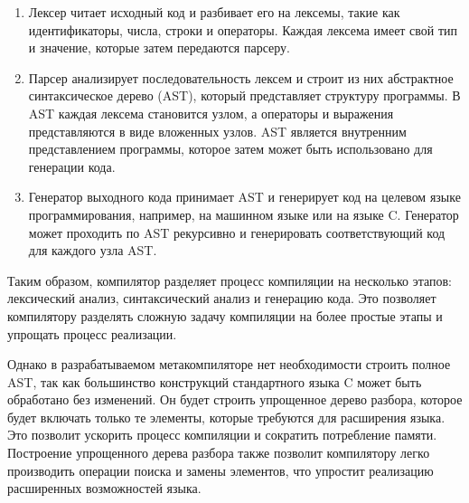 \begin{enumerate}
  \item Лексер читает исходный код и разбивает его на лексемы, такие как идентификаторы, числа, строки и операторы. Каждая лексема имеет свой тип и значение, которые затем передаются парсеру.

  \item Парсер анализирует последовательность лексем и строит из них абстрактное синтаксическое дерево (AST), который представляет структуру программы. В AST каждая лексема становится узлом, а операторы и выражения представляются в виде вложенных узлов. AST является внутренним представлением программы, которое затем может быть использовано для генерации кода.

  \item Генератор выходного кода принимает AST и генерирует код на целевом языке программирования, например, на машинном языке или на языке C. Генератор может проходить по AST рекурсивно и генерировать соответствующий код для каждого узла AST.
\end{enumerate}

Таким образом, компилятор разделяет процесс компиляции на несколько этапов: лексический анализ, синтаксический анализ и генерацию кода. Это позволяет компилятору разделять сложную задачу компиляции на более простые этапы и упрощать процесс реализации.

Однако в разрабатываемом метакомпиляторе нет необходимости строить полное AST, так как большинство конструкций стандартного языка C может быть обработано без изменений.
Он будет строить упрощенное дерево разбора, которое будет включать только те элементы, которые требуются для расширения языка.
Это позволит ускорить процесс компиляции и сократить потребление памяти.
Построение упрощенного дерева разбора также позволит компилятору легко производить операции поиска и замены элементов, что упростит реализацию расширенных возможностей языка.

